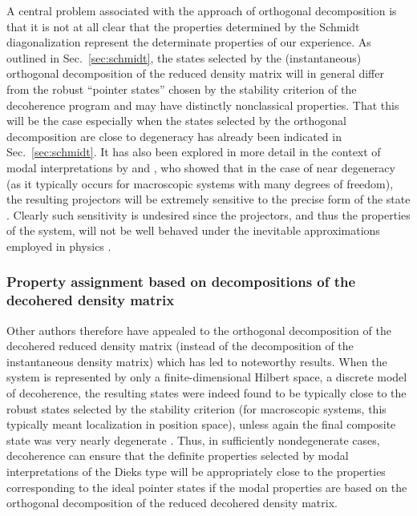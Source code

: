 \documentclass[rmp,aps,amsmath,amsfonts,noshowkeys,noshowpacs,12pt]{revtex4}
\begin{document}
A central problem associated with the approach of orthogonal
decomposition is that it is not at all clear that the properties
determined by the Schmidt diagonalization represent the determinate
properties of our experience. As outlined in Sec.~\ref{sec:schmidt},
the states selected by the (instantaneous) orthogonal decomposition of
the reduced density matrix will in general differ from the robust
``pointer states'' chosen by the stability criterion of the
decoherence program and may have distinctly nonclassical properties.
That this will be the case especially when the states selected by the
orthogonal decomposition are close to degeneracy has already been
indicated in Sec.~\ref{sec:schmidt}. It has also been explored in more
detail in the context of modal interpretations by
\citet{Bacciagaluppi:1995:zx} and \citet{Donald:1998:xz}, who showed
that in the case of near degeneracy (as it typically occurs for
macroscopic systems with many degrees of freedom), the resulting
projectors will be extremely sensitive to the precise form of the
state \citep{Bacciagaluppi:1995:zx}. Clearly such sensitivity is 
undesired since the projectors, and thus the properties of the system,
will not be well behaved under the inevitable approximations employed
in physics \citep{Donald:1998:xz}.


\subsubsection{Property assignment based on decompositions of the decohered density matrix}

Other authors therefore have appealed to the orthogonal decomposition
of the decohered reduced density matrix (instead of the decomposition
of the instantaneous density matrix) which has led to noteworthy
results.  When the system is represented by only a finite-dimensional
Hilbert space, a discrete model of decoherence, the resulting states
were indeed found to be typically close to the robust states selected
by the stability criterion (for macroscopic systems, this typically
meant localization in position space), unless again the final
composite state was very nearly degenerate
\citetext{\citealp{Bacciagaluppi:1996:po,Bene:2001:po}; see also
  Sec.~\ref{sec:schmidt}}. Thus, in sufficiently nondegenerate cases,
decoherence can ensure that the definite properties selected by modal
interpretations of the Dieks type will be appropriately close to the
properties corresponding to the ideal pointer states if the modal
properties are based on the orthogonal decomposition of the reduced
decohered density matrix.
\end{document}
